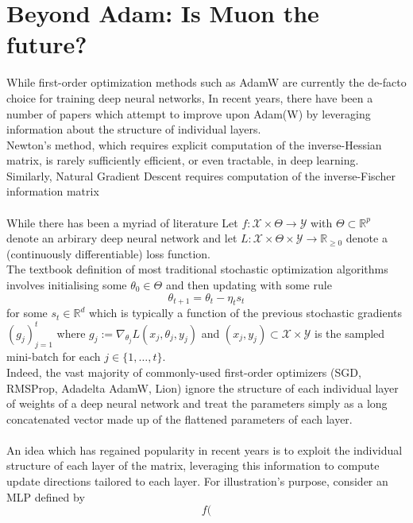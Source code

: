 \documentclass[12pt]{book}
\newcommand{\R}{\mathbb{R}}
\begin{document}
\chapter{Beyond Adam: Is Muon the future?}
While first-order optimization methods such as AdamW are currently the de-facto choice for training deep neural networks, 
In recent years, there have been a number of papers which attempt to improve upon Adam(W) by leveraging information about the structure of individual layers. \\
Newton's method, which requires explicit computation of the inverse-Hessian matrix, is rarely sufficiently efficient, or even tractable, in deep learning. Similarly, Natural Gradient Descent \cite{NGdescent} requires computation of the inverse-Fischer information matrix \\
\\
While there has been a myriad of literature
Let $f:\mathcal{X} \times \Theta \to \mathcal{Y}$ with $\Theta \subset \R^{p}$ denote an arbirary deep neural network and let $L:  \mathcal{X} \times \Theta \times \mathcal{Y} \to \R_{\ge0}$ denote a (continuously differentiable) loss function. \\
The textbook definition of most traditional stochastic optimization algorithms involves initialising some $\theta_0 \in \Theta$ and then updating with some rule 
\[
\theta_{t+1} = \theta_t - \eta_t s_t 
\] 
for some $s_t \in \R^{d}$ which is typically a function of the previous stochastic gradients $(g_{j})_{j=1}^t $ where $g_j := \nabla _{\theta_j} L(x_j, \theta_j, y_j)$ and $(x_j, y_j)\subset \mathcal{X}\times\mathcal{Y}$ is the sampled mini-batch for each $j\in\{1,\ldots,t\} $.  \\
Indeed, the vast majority of commonly-used first-order optimizers (SGD, RMSProp, Adadelta AdamW, Lion) ignore the structure of each individual layer of weights of a deep neural network and treat the parameters simply as a long concatenated vector made up of the flattened parameters of each layer.  \\
\\
An idea which has regained popularity in recent years is to exploit the individual structure of each layer of the matrix, leveraging this information to compute update directions tailored to each layer. For illustration's purpose, consider an MLP defined by 
\[
f(
\] 
\end{document}
